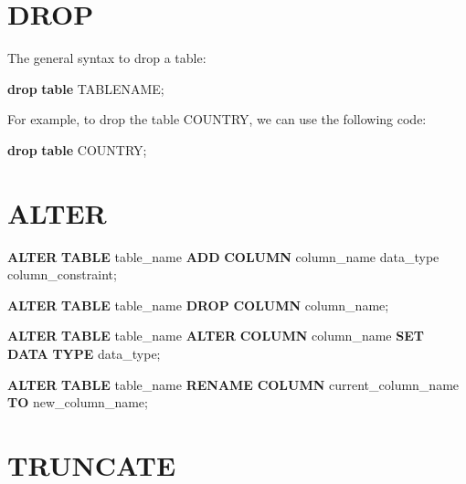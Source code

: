 \documentclass[
]{book}
\newenvironment{Shaded}{\begin{snugshade}}{\end{snugshade}}
\newcommand{\KeywordTok}[1]{\textcolor[rgb]{0.13,0.29,0.53}{\textbf{#1}}}
\newcommand{\NormalTok}[1]{#1}
\begin{document}
\hypertarget{drop}{%
\section{DROP}\label{drop}}

The general syntax to drop a table:

\begin{Shaded}
\begin{Highlighting}[]
\KeywordTok{drop} \KeywordTok{table}\NormalTok{ TABLENAME;}
\end{Highlighting}
\end{Shaded}

For example, to drop the table COUNTRY, we can use the following code:

\begin{Shaded}
\begin{Highlighting}[]
\KeywordTok{drop} \KeywordTok{table}\NormalTok{ COUNTRY;}
\end{Highlighting}
\end{Shaded}

\hypertarget{alter}{%
\section{ALTER}\label{alter}}

\begin{Shaded}
\begin{Highlighting}[]
\KeywordTok{ALTER} \KeywordTok{TABLE}\NormalTok{ table\_name}
\KeywordTok{ADD} \KeywordTok{COLUMN}\NormalTok{ column\_name data\_type column\_constraint;}

\KeywordTok{ALTER} \KeywordTok{TABLE}\NormalTok{ table\_name}
\KeywordTok{DROP} \KeywordTok{COLUMN}\NormalTok{ column\_name;}

\KeywordTok{ALTER} \KeywordTok{TABLE}\NormalTok{ table\_name}
\KeywordTok{ALTER} \KeywordTok{COLUMN}\NormalTok{ column\_name }\KeywordTok{SET} \KeywordTok{DATA} \KeywordTok{TYPE}\NormalTok{ data\_type;}

\KeywordTok{ALTER} \KeywordTok{TABLE}\NormalTok{ table\_name}
\KeywordTok{RENAME} \KeywordTok{COLUMN}\NormalTok{ current\_column\_name }\KeywordTok{TO}\NormalTok{ new\_column\_name;}
\end{Highlighting}
\end{Shaded}

\hypertarget{truncate}{%
\section{TRUNCATE}\label{truncate}}
\end{document}
